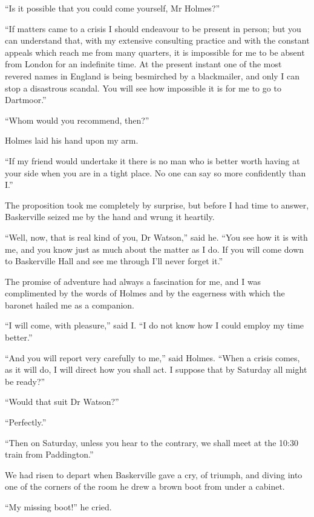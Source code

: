 \documentclass[paper=5.5in:8.5in,BCOR=7mm,twoside,DIV=calc,12pt,usegeometry,openany,chapterprefix,endperiod]{scrbook} %
\begin{document}
\enquote{Is it possible that you could come yourself, Mr Holmes?}

\enquote{If matters came to a crisis I should endeavour to be present in person; but you can understand that, with my extensive consulting practice and with the constant appeals which reach me from many quarters, it is impossible for me to be absent from London for an indefinite time. At the present instant one of the most revered names in England is being besmirched by a blackmailer, and only I can stop a disastrous scandal. You will see how impossible it is for me to go to Dartmoor.}

\enquote{Whom would you recommend, then?}

Holmes laid his hand upon my arm.

\enquote{If my friend would undertake it there is no man who is better worth having at your side when you are in a tight place. No one can say so more confidently than I.}

The proposition took me completely by surprise, but before I had time to answer, Baskerville seized me by the hand and wrung it heartily.

\enquote{Well, now, that is real kind of you, Dr Watson,} said he. \enquote{You see how it is with me, and you know just as much about the matter as I do. If you will come down to Baskerville Hall and see me through I'll never forget it.}

The promise of adventure had always a fascination for me, and I was complimented by the words of Holmes and by the eagerness with which the baronet hailed me as a companion.

\enquote{I will come, with pleasure,} said I. \enquote{I do not know how I could employ my time better.}

\enquote{And you will report very carefully to me,} said Holmes. \enquote{When a crisis comes, as it will do, I will direct how you shall act. I suppose that by Saturday all might be ready?}

\enquote{Would that suit Dr Watson?}

\enquote{Perfectly.}

\enquote{Then on Saturday, unless you hear to the contrary, we shall meet at the 10:30 train from Paddington.}

We had risen to depart when Baskerville gave a cry, of triumph, and diving into one of the corners of the room he drew a brown boot from under a cabinet.

\enquote{My missing boot!} he cried.
\end{document}
